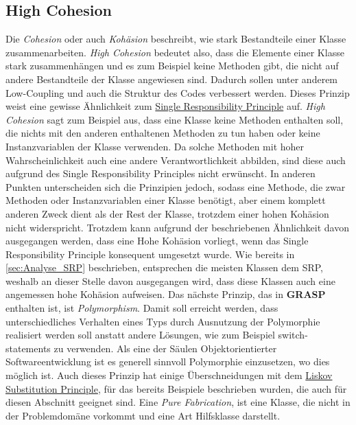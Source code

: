 \subsection{High Cohesion}
Die \textit{Cohesion} oder auch \textit{Kohäsion} beschreibt, wie stark Bestandteile einer Klasse zusammenarbeiten.
\textit{High Cohesion} bedeutet also, dass die Elemente einer Klasse stark zusammenhängen und es zum Beispiel keine Methoden gibt, die nicht auf andere Bestandteile der Klasse angewiesen sind.
Dadurch sollen unter anderem Low-Coupling und auch die Struktur des Codes verbessert werden.
Dieses Prinzip weist eine gewisse Ähnlichkeit zum \hyperref[sec:SRP]{Single Responsibility Principle} auf.
\textit{High Cohesion} sagt zum Beispiel aus, dass eine Klasse keine Methoden enthalten soll, die nichts mit den anderen enthaltenen Methoden zu tun haben oder keine Instanzvariablen der Klasse verwenden. 
Da solche Methoden mit hoher Wahrscheinlichkeit auch eine andere Verantwortlichkeit abbilden, sind diese auch aufgrund des Single Responsibility Principles nicht erwünscht.
In anderen Punkten unterscheiden sich die Prinzipien jedoch, sodass eine Methode, die zwar Methoden oder Instanzvariablen einer Klasse benötigt, aber einem komplett anderen Zweck dient als der Rest der Klasse, trotzdem einer hohen Kohäsion nicht widerspricht.
\newline
Trotzdem kann aufgrund der beschriebenen Ähnlichkeit davon ausgegangen werden, dass eine Hohe Kohäsion vorliegt, wenn das Single Responsibility Principle konsequent umgesetzt wurde.
Wie bereits in \ref{sec:Analyse_SRP} beschrieben, entsprechen die meisten Klassen dem SRP, weshalb an dieser Stelle davon ausgegangen wird, dass diese Klassen auch eine angemessen hohe Kohäsion aufweisen.
\newline
\newline
Das nächste Prinzip, das in \textbf{GRASP} enthalten ist, ist \textit{Polymorphism}.
Damit soll erreicht werden, dass unterschiedliches Verhalten eines Typs durch Ausnutzung der Polymorphie realisiert werden soll anstatt andere Lösungen, wie zum Beispiel switch-statements zu verwenden.
Als eine der Säulen Objektorientierter Softwareentwicklung ist es generell sinnvoll Polymorphie einzusetzen, wo dies möglich ist.
Auch dieses Prinzip hat einige Überschneidungen mit dem \hyperref[sec:LSP]{Liskov Substitution Principle}, für das bereits Beispiele beschrieben wurden, die auch für diesen Abschnitt geeignet sind.
\newline
\newline
Eine \textit{Pure Fabrication}, ist eine Klasse, die nicht in der Problemdomäne vorkommt und eine Art Hilfsklasse darstellt.
